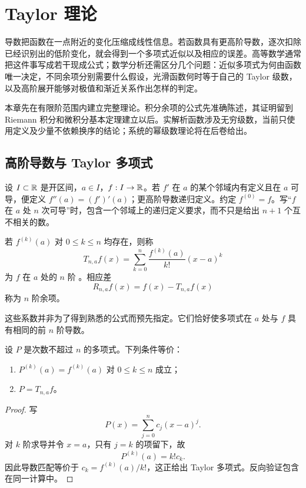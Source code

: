\chapter{Taylor 理论}
\label{chap:taylor-theory}

导数把函数在一点附近的变化压缩成线性信息。若函数具有更高阶导数，逐次扣除已经识别出的低阶变化，就会得到一个多项式近似以及相应的误差。高等数学通常把这件事写成若干现成公式；数学分析还需区分几个问题：近似多项式为何由函数唯一决定，不同余项分别需要什么假设，光滑函数何时等于自己的 Taylor 级数，以及高阶展开能够对极值和渐近关系作出怎样的判定。

本章先在有限阶范围内建立完整理论。积分余项的公式先准确陈述，其证明留到 Riemann 积分和微积分基本定理建立以后。实解析函数涉及无穷级数，当前只使用定义及少量不依赖换序的结论；系统的幂级数理论将在后卷给出。

\section{高阶导数与 Taylor 多项式}

设 \(I\subset\mathbb{R}\) 是开区间，\(a\in I\)，\(f:I\to\mathbb{R}\)。若 \(f'\) 在 \(a\) 的某个邻域内有定义且在 \(a\) 可导，便定义 \(f''(a)=(f')'(a)\)；更高阶导数递归定义。约定 \(f^{(0)}=f\)。写“\(f\) 在 \(a\) 处 \(n\) 次可导”时，包含一个邻域上的递归定义要求，而不只是给出 \(n+1\) 个互不相关的数。

\begin{definition}
若 \(f^{(k)}(a)\) 对 \(0\le k\le n\) 均存在，则称
\[
 T_{n,a}f(x)=\sum_{k=0}^{n}\frac{f^{(k)}(a)}{k!}(x-a)^k
\]
为 \(f\) 在 \(a\) 处的 \(n\) 阶 。相应差
\[
 R_{n,a}f(x)=f(x)-T_{n,a}f(x)
\]
称为 \(n\) 阶余项。
\end{definition}

这些系数并非为了得到熟悉的公式而预先指定。它们恰好使多项式在 \(a\) 处与 \(f\) 具有相同的前 \(n\) 阶导数。

\begin{proposition}[导数匹配与唯一性]
设 \(P\) 是次数不超过 \(n\) 的多项式。下列条件等价：
\begin{enumerate}
 \item \(P^{(k)}(a)=f^{(k)}(a)\) 对 \(0\le k\le n\) 成立；
 \item \(P=T_{n,a}f\)。
\end{enumerate}
\end{proposition}

\begin{proof}
写
\[
 P(x)=\sum_{j=0}^{n}c_j(x-a)^j.
\]
对 \(k\) 阶求导并令 \(x=a\)，只有 \(j=k\) 的项留下，故
\[
 P^{(k)}(a)=k!c_k.
\]
因此导数匹配等价于 \(c_k=f^{(k)}(a)/k!\)，这正给出 Taylor 多项式。反向验证包含在同一计算中。
\end{proof}

